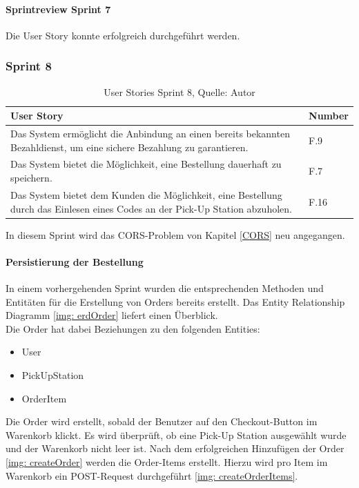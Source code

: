 \paragraph{Sprintreview Sprint 7}
Die \gls{User Story} konnte erfolgreich durchgeführt werden. 

\subsubsection{Sprint 8}\label{sprint8}
\begin{table}[H]
	\setlength\extrarowheight{2pt} %
	\begin{tabularx}{\textwidth}{|X|l|}
		\hline
		\textbf{User Story} & \textbf{Number} \\
		\hline
		Das System ermöglicht die Anbindung an einen bereits bekannten Bezahldienst, um eine sichere Bezahlung zu garantieren.  & F.9\\
		\hline
		Das System bietet die Möglichkeit, eine Bestellung dauerhaft zu speichern. & F.7\\
		\hline
		Das System bietet dem Kunden die Möglichkeit, eine Bestellung durch das Einlesen eines Codes an der Pick-Up Station abzuholen.  & F.16\\
		\hline
	\end{tabularx} 
	\caption[User Stories Sprint 8]{User Stories Sprint 8, Quelle: Autor}
\end{table}\label{userStoriesSprint8}
In diesem Sprint wird das CORS-Problem von Kapitel \ref{CORS} neu angegangen. 

\paragraph{Persistierung der Bestellung}
In einem vorhergehenden Sprint wurden die entsprechenden Methoden und Entitäten für die Erstellung von Orders bereits erstellt. Das Entity Relationship Diagramm \ref{img: erdOrder} liefert einen Überblick. \\
Die Order hat dabei Beziehungen zu den folgenden Entities: 
\begin{itemize}
	\item User
	\item PickUpStation
	\item OrderItem
\end{itemize}
Die Order wird erstellt, sobald der Benutzer auf den Checkout-Button im Warenkorb klickt. Es wird überprüft, ob eine Pick-Up Station ausgewählt wurde und der Warenkorb nicht leer ist. Nach dem erfolgreichen Hinzufügen der Order \ref{img: createOrder} werden die Order-Items erstellt. Hierzu wird pro Item im Warenkorb ein POST-Request durchgeführt \ref{img: createOrderItems}. 

